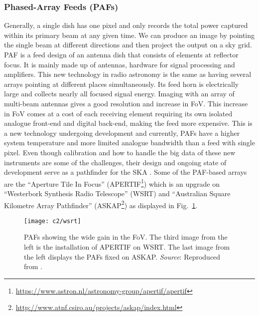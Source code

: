 \subsubsection{Phased-Array Feeds (PAFs)}	   \label{chap2:sec4.3.1}
%
Generally, a single dish has one pixel and only records the total power captured within its primary beam at any given time. We can produce an image by pointing the single
beam at different directions and then project the output on a sky grid. PAF is a feed design of an antenna dish that consists of elements at reflector focus. 
It is mainly made up of antennas, hardware for signal processing and amplifiers.
This new technology in radio astronomy is the same as having several arrays pointing at different places simultaneously. Its feed
horn is electrically large and collects nearly all focused signal energy. Imaging with an array of multi-beam antennas gives a good resolution and increase in FoV. 
This increase in FoV comes at a cost of each receiving element requiring its own isolated analogue front-end and digital back-end, making the feed more expensive.
This is a new technology undergoing development and currently, PAFs have a higher system temperature and more limited analogue bandwidth than a feed with single pixel.
Even though calibration and how to handle the big data of these new instruments are some of the challenges, their design and ongoing state of development serve as a pathfinder for the SKA \citep{6051207}. 
Some of the PAF-based arrays are the \enquote{Aperture Tile In Focus} (APERTIF\footnote{\url{https://www.astron.nl/astronomy-group/apertif/apertif}}) \citep{oosterloo2009apertif} 
which is an upgrade on  \enquote{Westerbork Synthesis Radio Telescope} (WSRT) and 
\enquote{Australian Square Kilometre Array Pathfinder} (ASKAP\footnote{\url{ http://www.atnf.csiro.au/projects/askap/index.html}}) \citep{johnston2009science}
as displayed in Fig.~\ref{fig:pafs}.
%
\begin{figure}[ht]
	    \centering	    
	    \texttt{[image: c2/wsrt]}
	    \caption{PAFs showing the wide gain in the FoV. The third image from the left is the installation of APERTIF on WSRT. 
	    The last image from the left displays the PAFs fixed on ASKAP.  \emph{Source}: Reproduced from \cite{garrett2013radio}.
	    }
	    \label{fig:pafs}
       \end{figure}
  \FloatBarrier 

